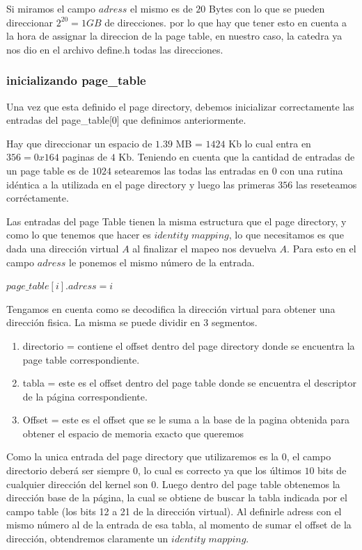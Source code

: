 \documentclass[a4paper,10pt,twoside]{article}
\begin{document}
Si miramos el campo $adress$ el mismo es de $20$ Bytes con lo que se pueden direccionar $2^{20} = 1GB$ de direcciones. por lo que hay que tener esto en cuenta a la hora de assignar la direccion de la page table, en nuestro caso, la catedra ya nos dio en el archivo define.h todas las direcciones.

\subsubsection{inicializando page\_table}
Una vez que esta definido el page directory, debemos inicializar correctamente las entradas del page\_table[0] que definimos anteriormente.

Hay que direccionar un espacio de $1.39$ MB =  $1424$ Kb lo cual entra en $356 = 0x164$ paginas de $4$ Kb. Teniendo en cuenta que la cantidad de entradas de un page table es de $1024$ setearemos las todas las entradas en $0$ con una rutina idéntica a la utilizada en el page directory y luego las primeras $356$ las reseteamos corréctamente.

Las entradas del page Table tienen la misma estructura que el page directory, y como lo que tenemos que hacer es $identity$ $mapping$, lo que necesitamos es que dada una dirección virtual $A$ al finalizar el mapeo nos devuelva $A$. Para esto en el campo $adress$ le ponemos el mismo número de la entrada.

$page\_table[i].adress = i$

Tengamos en cuenta como se decodifica la dirección virtual para obtener una dirección fisica. La misma se puede dividir en $3$ segmentos.

\begin{enumerate}
 \item directorio = contiene el offset dentro del page directory donde se encuentra la page table correspondiente.
 \item tabla = este es el offset dentro del page table donde se encuentra el descriptor de la página correspondiente.
 \item Offset = este es el offset que se le suma a la base de la pagina obtenida para obtener el espacio de memoria exacto que queremos
\end{enumerate}

Como la unica entrada del page directory que utilizaremos es la $0$, el campo directorio deberá ser siempre $0$, lo cual es correcto ya que los últimos $10$ bits de cualquier dirección del kernel son $0$. Luego dentro del page table obtenemos la dirección base de la página, la cual se obtiene de buscar la tabla indicada por el campo table (los bits 12 a 21 de la dirección virtual). Al definirle adress con el mismo número al de la entrada de esa tabla, al momento de sumar el offset de la dirección, obtendremos claramente un $identity$ $mapping$. \\
\end{document}
